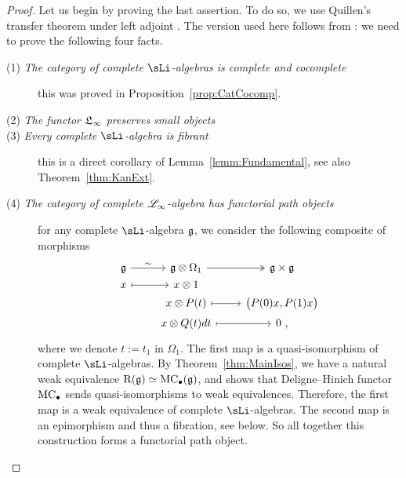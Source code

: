 \documentclass[twoside, 10pt]{amsart}
\begin{document}
\begin{proof}
Let us begin by proving the last assertion. To do so, we use Quillen's transfer theorem under left adjoint \cite[Section~II.4]{Quillen67}. The version used here follows from  \cite[Section~2.6]{BergerMoerdijk03}: we need to prove the following four facts. 
\begin{description}
\item[\rm (1) \it  The category of complete $\sLi$-algebras is complete and cocomplete] this 
was proved in Proposition~\ref{prop:CatCocomp}. 

\item[\rm (2) \it 
The functor $\mathfrak{L}_\infty$ preserves small objects
] 

\item[\rm (3) \it Every complete $\sLi$-algebra is fibrant] this is a direct corollary of 
Lemma~\ref{lemm:Fundamental}, see also Theorem~\ref{thm:KanExt}. 

\item[\rm (4) \it The category of complete $\mathscr{L}_\infty$-algebra has functorial path objects] for any complete $\sLi$-algebra $\mathfrak{g}$, we consider the following composite of morphisms
\[
\vcenter{\hbox{
\begin{tikzcd}[column sep=0.8cm, row sep=0cm]
\g 
\arrow[r, "\sim"]
& \g \otimes \Omega_1 
\arrow[r, twoheadrightarrow]
& \g \times \g\\
x\arrow[r,mapsto] & x\otimes 1 & \\
& x\otimes P(t)  \arrow[r,mapsto]  & \big(P(0)x, P(1)x\big) \\
& x\otimes Q(t)dt  \arrow[r,mapsto]  & 0\ ,\\
\end{tikzcd}
}}
\]
where we denote $t:=t_1$ in $\Omega_1$. 
The first map is a quasi-isomorphism of complete $\sLi$-algebras. By Theorem~\ref{thm:MainIsos}, we have a natural weak equivalence $\mathrm{R}(\mathfrak{g})\simeq \mathrm{MC}_\bullet(\mathfrak{g})$, and \cite[Theorem~1.1]{DolgushevRogers15} shows that Deligne--Hinich functor $\mathrm{MC}_\bullet$ sends quasi-isomorphisms to weak equivalences. Therefore, the first map is a weak equivalence of complete $\sLi$-algebras. The second map is an epimorphism and thus a fibration, see below. So all together this construction forms a functorial path object. 


\end{description}
\end{proof}
\end{document}
